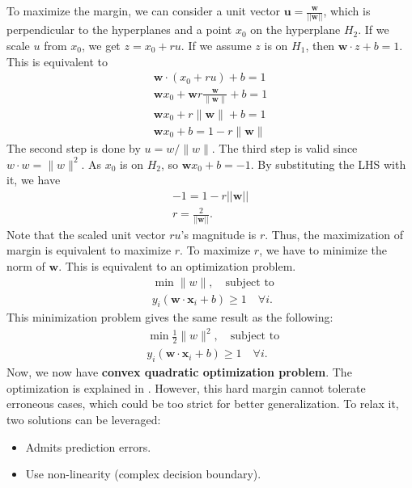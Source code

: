 To maximize the margin, we can consider a unit vector $\mathbf{u} = \frac{\mathbf{w}}{||\mathbf{w}||}$, which is perpendicular to the hyperplanes and a point $x_0$ on the hyperplane $H_2$. If we scale $u$ from $x_0$, we get $z = x_0+ru$. If we assume $z$ is on $H_1$, then $\mathbf{w}\cdot z +b=1$. This is equivalent to 
\begin{align*}
	\mathbf{w}\cdot (x_0+ru)+b=1\\
	\mathbf{w}x_0+\mathbf{w}r\frac{\mathbf{w}}{\|\mathbf{w}\|}+b=1\\
	\mathbf{w}x_0+r\|\mathbf{w}\|+b=1\\
	\mathbf{w}x_0+b=1-r\|\mathbf{w}\|
\end{align*}
The second step is done by $u=w/\|w\|$. The third step is valid since $w\cdot w = \|w\|^2$. As $x_0$ is on $H_2$, so $\mathbf{w}x_0+b=-1$. By substituting the LHS with it, we have
\begin{align*}
	-1=1-r||\mathbf{w}||\\
	r=\frac{2}{||\mathbf{w}||}.
\end{align*}
Note that the scaled unit vector $ru$'s magnitude is $r$. Thus, the maximization of margin is equivalent to maximize $r$. To maximize $r$, we have to minimize the norm of $\mathbf{w}$. This is equivalent to an optimization problem. 
\begin{align*}
	&\min \|w\|,\quad \textrm{subject to } \\
	&y_i(\mathbf{w}\cdot \mathbf{x}_i+b)\geq 1 \quad\forall i.
\end{align*}
This minimization problem gives the same result as the following:  
\begin{align*}
	&\min \frac{1}{2}\|w\|^2,\quad \textrm{subject to } \\
	&y_i(\mathbf{w}\cdot \mathbf{x}_i+b)\geq 1 \quad\forall i.
\end{align*}
Now, we now have \textbf{convex quadratic optimization problem}. The optimization is explained in . However, this hard margin cannot tolerate erroneous cases, which could be too strict for better generalization. To relax it, two solutions can be leveraged:
\begin{itemize}
	\item Admits prediction errors. 
	\item Use non-linearity (complex decision boundary).
\end{itemize}

